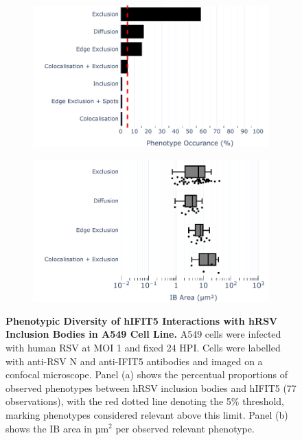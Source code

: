 \begin{figure}
    \begin{subfigure}{0.495\textwidth}
        \caption{}
        \includegraphics[width=1\linewidth]{08. Chapter 3/Figs/02. Infection/04. IFIT5/01. bar_i5_a549.pdf} 
    \end{subfigure}
    \begin{subfigure}{0.495\textwidth}
        \caption{}
        \includegraphics[width=1\linewidth]{08. Chapter 3/Figs/02. Infection/04. IFIT5/02. box_i5_a549.pdf}
    \end{subfigure}
    \caption[Phenotypic Diversity of hIFIT5 Interactions with hRSV Inclusion Bodies in A549 Cell Line.]{\textbf{Phenotypic Diversity of hIFIT5 Interactions with hRSV Inclusion Bodies in A549 Cell Line.} A549 cells were infected with human RSV at MOI 1 and fixed 24 HPI. Cells were labelled with anti-RSV N and anti-IFIT5 antibodies and imaged on a confocal microscope. Panel (a) shows the percentual proportions of observed phenotypes between hRSV inclusion bodies and hIFIT5 (77 observations), with the red dotted line denoting the 5\% threshold, marking phenotypes considered relevant above this limit. Panel (b) shows the IB area in \(\mbox{µm}^2\) per observed relevant phenotype.}
    \label{fig:Phenotypic Diversity of hIFIT5 Interactions with hRSV Inclusion Bodies in A549 Cell Line}
\end{figure}

